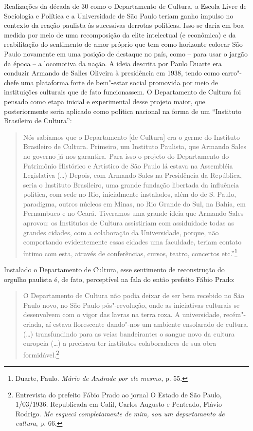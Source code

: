 Realizações da década de 30 como o Departamento de Cultura, a Escola
Livre de Sociologia e Política e a Universidade de São Paulo teriam
ganho impulso no contexto da reação paulista às sucessivas derrotas
políticas. Isso se daria em boa medida por meio de uma recomposição da
elite intelectual (e econômica) e da reabilitação do sentimento de amor
próprio que tem como horizonte colocar São Paulo novamente em uma
posição de destaque no país, como -- para usar o jargão da época -- a
locomotiva da nação. A ideia descrita por Paulo Duarte era conduzir
Armando de Salles Oliveira à presidência em 1938, tendo como carro"-chefe
uma plataforma forte de bem"-estar social promovida por meio de
instituições culturais que de fato funcionassem. O Departamento de
Cultura foi pensado como etapa inicial e experimental desse projeto
maior, que posteriormente seria aplicado como política nacional na forma
de um ``Instituto Brasileiro de Cultura'':

\begin{quote}
Nós sabíamos que o Departamento {[}de Cultura{]} era o germe do
Instituto Brasileiro de Cultura. Primeiro, um Instituto Paulista, que
Armando Sales no governo já nos garantira. Para isso o projeto do
Departamento do Patrimônio Histórico e Artístico de São Paulo lá estava
na Assembléia Legislativa (\ldots{}) Depois, com Armando Sales na Presidência
da República, seria o Instituto Brasileiro, uma grande fundação
libertada da influência política, com sede no Rio, inicialmente
instalados, além do de S. Paulo, paradigma, outros núcleos em Minas, no
Rio Grande do Sul, na Bahia, em Pernambuco e no Ceará. Tiveramos uma
grande ideia que Armando Sales aprovou: os Institutos de Cultura
assistiriam com assiduidade todas as grandes cidades, com a colaboração
da Universidade, porque, não comportando evidentemente essas cidades uma
faculdade, teriam contato íntimo com esta, através de conferências,
cursos, teatro, concertos etc.''\footnote{Duarte, Paulo. \emph{Mário de
  Andrade por ele mesmo,} p. 55.}
\end{quote}

Instalado o Departamento de Cultura, esse sentimento de reconstrução do
orgulho paulista é, de fato, perceptível na fala do então prefeito Fábio
Prado:

\begin{quote}
O Departamento de Cultura não podia deixar de ser bem recebido no São
Paulo novo, no São Paulo pós"-revolução, onde as iniciativas culturais se
desenvolvem com o vigor das lavras na terra roxa. A universidade,
recém"-criada, aí estava florescente dando"-nos um ambiente ensolarado de
cultura. (\ldots{}) transfundindo para as veias bandeirantes o sangue
novo da cultura europeia (\ldots{}) a  precisava ter institutos
colaboradores de sua obra formidável.\footnote{Entrevista do prefeito
  Fábio Prado ao jornal O Estado de São Paulo, 1/03/1936. Republicada em
  Calil, Carlos Augusto e Penteado, Flávio Rodrigo. \emph{Me esqueci
  completamente de mim, sou um departamento de cultura}, p. 66.}
\end{quote}

